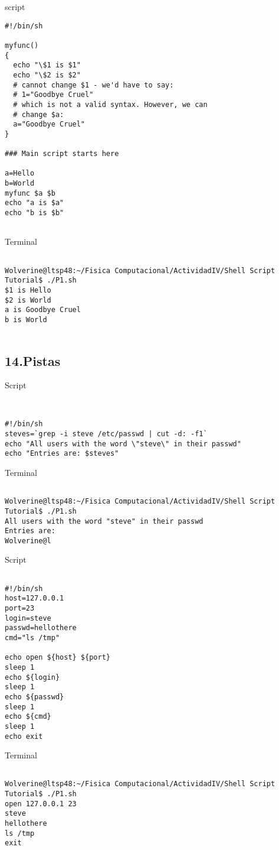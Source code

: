 \documentclass[a4paper]{article}
\begin{document}
script
\begin{verbatim}
#!/bin/sh

myfunc()
{
  echo "\$1 is $1"
  echo "\$2 is $2"
  # cannot change $1 - we'd have to say:
  # 1="Goodbye Cruel"
  # which is not a valid syntax. However, we can
  # change $a:
  a="Goodbye Cruel"
}

### Main script starts here 

a=Hello
b=World
myfunc $a $b
echo "a is $a"
echo "b is $b"


\end{verbatim}
Terminal
\begin{verbatim}

Wolverine@ltsp48:~/Fisica Computacional/ActividadIV/Shell Script Tutorial$ ./P1.sh
$1 is Hello
$2 is World
a is Goodbye Cruel
b is World


\end{verbatim}

\subsection{14.Pistas}


Script
\begin{verbatim}


#!/bin/sh
steves=`grep -i steve /etc/passwd | cut -d: -f1`
echo "All users with the word \"steve\" in their passwd"
echo "Entries are: $steves"
\end{verbatim}
Terminal
\begin{verbatim}

Wolverine@ltsp48:~/Fisica Computacional/ActividadIV/Shell Script Tutorial$ ./P1.sh
All users with the word "steve" in their passwd
Entries are: 
Wolverine@l

\end{verbatim}
Script
\begin{verbatim}

#!/bin/sh
host=127.0.0.1
port=23
login=steve
passwd=hellothere
cmd="ls /tmp"

echo open ${host} ${port}
sleep 1
echo ${login}
sleep 1
echo ${passwd}
sleep 1
echo ${cmd}
sleep 1
echo exit

\end{verbatim}

Terminal
\begin{verbatim}

Wolverine@ltsp48:~/Fisica Computacional/ActividadIV/Shell Script Tutorial$ ./P1.sh
open 127.0.0.1 23
steve
hellothere
ls /tmp
exit

\end{verbatim}
\end{document}
